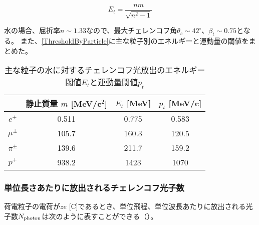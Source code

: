 \begin{equation}
E_{t} = \frac{nm}{\sqrt{n^{2}-1}}
\label{EnergyThreshold}
\end{equation}


水の場合、屈折率$n\sim1.33$なので、最大チェレンコフ角$\theta_{c} \sim 42^{\circ}$、$\beta_{t} \sim 0.75$となる。
また、\autoref{ThresholdByParticle}に主な粒子別のエネルギーと運動量の閾値をまとめた。


\begin{table}[htbp]
\caption[主な粒子の水に対するチェレンコフ光放出のエネルギー閾値と運動量閾値]{主な粒子の水に対するチェレンコフ光放出のエネルギー閾値$E_{t}$と運動量閾値$p_{t}$}
\begin{center}
\begin{tabular}{c|ccc}
\hline \hline
& 静止質量 $m$ [MeV/c$^{2}$] & $E_{t}$ [MeV] & $p_{t}$ [MeV/c]\\
\hline
$e^{\pm}$	& 0.511	& 0.775 & 0.583\\
$\mu^{\pm}$	& 105.7 & 160.3 & 120.5\\
$\pi^{\pm}$	& 139.6 & 211.7 & 159.2 \\
$p^{+}$	& 938.2	& 1423 & 1070\\
\hline \hline
\end{tabular}
\end{center}
\label{ThresholdByParticle}
\end{table}%

\subsubsection{単位長さあたりに放出されるチェレンコフ光子数}

荷電粒子の電荷が$ze$ [C]であるとき、単位飛程、単位波長あたりに放出される光子数$N_{\mathrm{photon}}$は次のように表すことができる（）。


